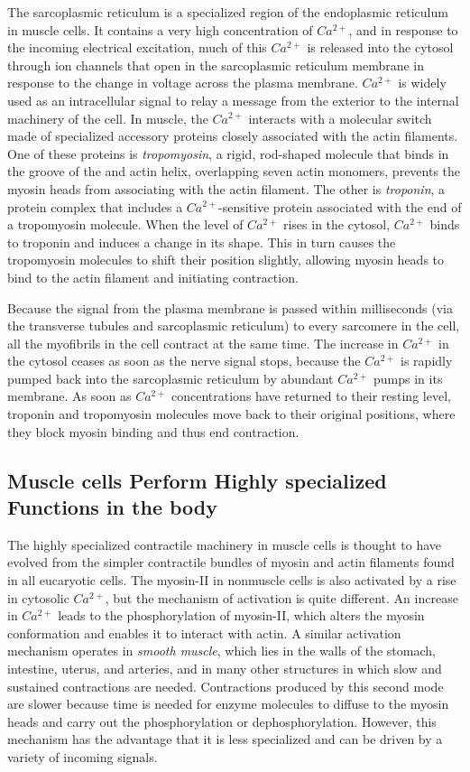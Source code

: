 The sarcoplasmic reticulum is a specialized region of the endoplasmic
reticulum in muscle cells. It contains a very high concentration of $Ca^{2+}$,
and in response to the incoming electrical excitation, much of this $Ca^{2+}$
is released into the cytosol through ion channels that open in the sarcoplasmic
reticulum membrane in response to the change in voltage across
the plasma membrane. $Ca^{2+}$ is widely used as an intracellular signal to relay a message from the exterior
to the internal machinery of the cell. In muscle, the $Ca^{2+}$ interacts with a
molecular switch made of specialized accessory proteins closely associated
with the actin filaments. One of these proteins is
\textit{tropomyosin}, a rigid, rod-shaped molecule that binds in the groove of the
and actin helix, overlapping seven actin monomers, prevents the myosin
heads from associating with the actin filament. The other is \textit{troponin}, a
protein complex that includes a $Ca^{2+}$-sensitive protein associated with
the end of a tropomyosin molecule. When the level of $Ca^{2+}$ rises in the
cytosol, $Ca^{2+}$ binds to troponin and induces a change in its shape. This
in turn causes the tropomyosin molecules to shift their position slightly,
allowing myosin heads to bind to the actin filament and initiating contraction.

Because the signal from the plasma membrane is passed within milliseconds
(via the transverse tubules and sarcoplasmic reticulum) to every
sarcomere in the cell, all the myofibrils in the cell contract at the same
time. The increase in $Ca^{2+}$ in the cytosol ceases as soon as the nerve signal
stops, because the $Ca^{2+}$ is rapidly pumped back into the sarcoplasmic
reticulum by abundant $Ca^{2+}$ pumps in its membrane.
As soon as $Ca^{2+}$ concentrations have returned to their resting level,
troponin and tropomyosin molecules move back to their original positions,
where they block myosin binding and thus end contraction.

\subsection{Muscle cells Perform Highly specialized Functions in the body}

The highly specialized contractile machinery in muscle cells is thought
to have evolved from the simpler contractile bundles of myosin and actin
filaments found in all eucaryotic cells. The myosin-II in nonmuscle cells
is also activated by a rise in cytosolic $Ca^{2+}$, but the mechanism of activation
is quite different. An increase in $Ca^{2+}$ leads to the phosphorylation of
myosin-II, which alters the myosin conformation and enables it to interact
with actin. A similar activation mechanism operates in \textit{smooth muscle},
which lies in the walls of the stomach, intestine, uterus, and arteries, and
in many other structures in which slow and sustained contractions are
needed. Contractions produced by this second mode are slower because
time is needed for enzyme molecules to diffuse to the myosin heads
and carry out the phosphorylation or dephosphorylation. However, this
mechanism has the advantage that it is less specialized and can be driven
by a variety of incoming signals.

